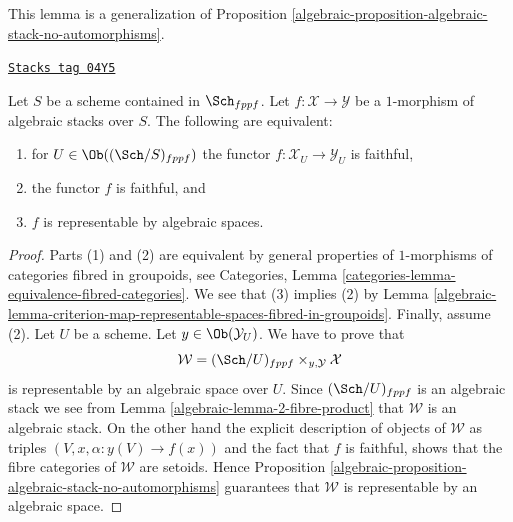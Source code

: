This lemma is a generalization of
Proposition \ref{algebraic-proposition-algebraic-stack-no-automorphisms}.

\begin{lemma}
\label{algebraic-lemma-characterize-representable-by-algebraic-spaces}
\href{https://stacks.math.columbia.edu/tag/04Y5}{\texttt{Stacks tag 04Y5}}

Let $S$ be a scheme contained in $\Sch_{fppf}$.
Let $f : \mathcal{X} \to \mathcal{Y}$ be a $1$-morphism of algebraic
stacks over $S$. The following are equivalent:
\begin{enumerate}
\item for $U \in \Ob((\Sch/S)_{fppf})$
the functor $f : \mathcal{X}_U \to \mathcal{Y}_U$ is faithful,
\item the functor $f$ is faithful, and
\item $f$ is representable by algebraic spaces.
\end{enumerate}
\end{lemma}

\begin{proof}

Parts (1) and (2) are equivalent by general properties of $1$-morphisms
of categories fibred in groupoids, see
Categories, Lemma \ref{categories-lemma-equivalence-fibred-categories}.
We see that (3) implies (2) by
Lemma \ref{algebraic-lemma-criterion-map-representable-spaces-fibred-in-groupoids}.
Finally, assume (2).
Let $U$ be a scheme. Let $y \in \Ob(\mathcal{Y}_U)$.
We have to prove that
$$
\mathcal{W} = (\Sch/U)_{fppf} \times_{y, \mathcal{Y}} \mathcal{X}
$$
is representable by an algebraic space over $U$. Since
$(\Sch/U)_{fppf}$ is an algebraic stack we see from
Lemma \ref{algebraic-lemma-2-fibre-product}
that $\mathcal{W}$ is an algebraic stack.
On the other hand the explicit description of objects of $\mathcal{W}$
as triples $(V, x, \alpha : y(V) \to f(x))$ and the fact that $f$ is
faithful, shows that the fibre categories of $\mathcal{W}$ are setoids. Hence
Proposition \ref{algebraic-proposition-algebraic-stack-no-automorphisms}
guarantees that $\mathcal{W}$ is representable by an algebraic space.
\end{proof}

